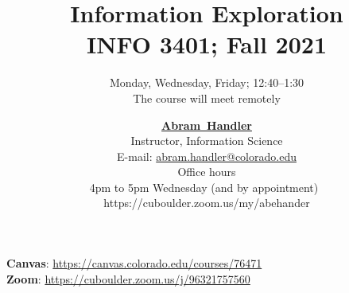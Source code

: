\documentclass[10pt]{memoir}
\makeatletter
\def\mycoursename{Information Exploration}
\def\mycourselisting{INFO 3401}
\def\myclassroom{The course will meet remotely}
\def\myzoomurl{https://cuboulder.zoom.us/j/96321757560}
\def\mycanvasurl{https://canvas.colorado.edu/courses/76471}
\def\mymeetingdays{Monday, Wednesday, Friday}
\def\mymeetingtimes{12:40--1:30}
\def\mydate{Fall 2021}
\def\instructorAfirstname{Abram}
\def\instructorAlastname{Handler}
\def\instructorAfullname{\instructorAfirstname~\instructorAlastname}
\def\instructorAtitle{Instructor, Information Science}
\def\instructorAoffice{https://cuboulder.zoom.us/my/abehander}
\def\instructorAemail{abram.handler@colorado.edu}
\def\instructorAwebsite{https://www.abehandler.com/}
\def\instructorAofficehours{4pm to 5pm Wednesday (and by appointment)}
\makeatother
\begin{document}
\nobibliography*


\title{
    \textbf{\huge{\mycoursename}}\\
    \vspace{5pt} \normalsize{\mycourselisting}; \mydate
}

\author{
    \mymeetingdays; \mymeetingtimes\\
    \myclassroom\\
}

\date{
    \normalsize{
        \href{\instructorAwebsite}{\textbf{\instructorAfullname}}\\
        \instructorAtitle\\
        E-mail: \href{mailto:\instructorAemail}{\instructorAemail}\\
        \vspace{1em}
        Office hours\\ \instructorAofficehours~\\ \instructorAoffice\\ \vspace{0em}
    }
}

\maketitle



{\textbf{Canvas}: \href{\mycanvasurl}{\mycanvasurl}}\\
{\textbf{Zoom}: \href{\myzoomurl}{\myzoomurl}}
\end{document}
